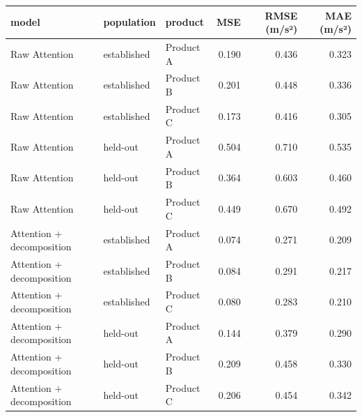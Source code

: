 \begin{tabular}{lllrrr}
\toprule
model & population & product & MSE & RMSE (m/s²) & MAE (m/s²) \\
\midrule
Raw Attention & established & Product A & 0.190 & 0.436 & 0.323 \\
Raw Attention & established & Product B & 0.201 & 0.448 & 0.336 \\
Raw Attention & established & Product C & 0.173 & 0.416 & 0.305 \\
Raw Attention & held-out & Product A & 0.504 & 0.710 & 0.535 \\
Raw Attention & held-out & Product B & 0.364 & 0.603 & 0.460 \\
Raw Attention & held-out & Product C & 0.449 & 0.670 & 0.492 \\
Attention + decomposition & established & Product A & 0.074 & 0.271 & 0.209 \\
Attention + decomposition & established & Product B & 0.084 & 0.291 & 0.217 \\
Attention + decomposition & established & Product C & 0.080 & 0.283 & 0.210 \\
Attention + decomposition & held-out & Product A & 0.144 & 0.379 & 0.290 \\
Attention + decomposition & held-out & Product B & 0.209 & 0.458 & 0.330 \\
Attention + decomposition & held-out & Product C & 0.206 & 0.454 & 0.342 \\
\bottomrule
\end{tabular}
